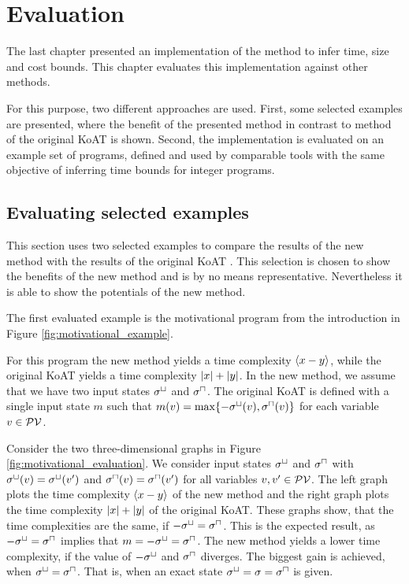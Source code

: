 \section{Evaluation}

The last chapter presented an implementation of the method to infer time, size and cost bounds.
This chapter evaluates this implementation against other methods.

For this purpose, two different approaches are used.
First, some selected examples are presented, where the benefit of the presented method in contrast to method of the original KoAT \cite{koat} is shown.
Second, the implementation is evaluated on an example set of programs, defined and used by comparable tools with the same objective of inferring time bounds for integer programs.

\subsection{Evaluating selected examples}

This section uses two selected examples to compare the results of the new method with the results of the original KoAT \cite{koat}.
This selection is chosen to show the benefits of the new method and is by no means representative.
Nevertheless it is able to show the potentials of the new method.

The first evaluated example is the motivational program from the introduction in Figure \ref{fig:motivational_example}.



For this program the new method yields a time complexity $\langle x-y\rangle$, while the original KoAT \cite{koat} yields a time complexity $\left|x\right|+\left|y\right|$.
In the new method, we assume that we have two input states ${\sigma^\sqcup}$ and ${\sigma^\sqcap}$.
The original KoAT is defined with a single input state $m$ such that $m(v) = \max \lbrace -{\sigma^\sqcup}(v),{\sigma^\sqcap}(v) \rbrace$ for each variable $v \in \mathcal{PV}$.

Consider the two three-dimensional graphs in Figure \ref{fig:motivational_evaluation}.
We consider input states ${\sigma^\sqcup}$ and ${\sigma^\sqcap}$ with ${\sigma^\sqcup}(v) = {\sigma^\sqcup}(v')$ and ${\sigma^\sqcap}(v) = {\sigma^\sqcap}(v')$ for all variables $v, v' \in \mathcal{PV}$.
The left graph plots the time complexity $\langle x-y\rangle$ of the new method and the right graph plots the time complexity $\left|x\right|+\left|y\right|$ of the original KoAT.
These graphs show, that the time complexities are the same, if $-{\sigma^\sqcup} = {\sigma^\sqcap}$.
This is the expected result, as $-{\sigma^\sqcup} = {\sigma^\sqcap}$ implies that $m = -{\sigma^\sqcup} = {\sigma^\sqcap}$.
The new method yields a lower time complexity, if the value of $-{\sigma^\sqcup}$ and ${\sigma^\sqcap}$ diverges.
The biggest gain is achieved, when ${\sigma^\sqcup} = {\sigma^\sqcap}$.
That is, when an exact state ${\sigma^\sqcup} = \sigma = {\sigma^\sqcap}$ is given.

